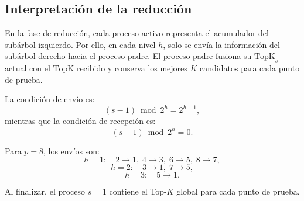 \documentclass[11pt,a4paper]{article}
\begin{document}
\begin{algorithm}[H]
\BlankLine
{}
\end{algorithm}

\begin{algorithm}
\end{algorithm}

\subsection{Interpretación de la reducción}

En la fase de reducción, cada proceso activo representa el acumulador del subárbol izquierdo.
Por ello, en cada nivel $h$, solo se envía la información del subárbol derecho hacia el proceso
padre. El proceso padre fusiona su $\mathrm{TopK}_s$ actual con el $\mathrm{TopK}$ recibido y conserva
los mejores $K$ candidatos para cada punto de prueba.

La condición de envío es:
\[
(s-1) \bmod 2^h = 2^{h-1},
\]
mientras que la condición de recepción es:
\[
(s-1) \bmod 2^h = 0.
\]

Para $p=8$, los envíos son:
\[
h=1: \quad 2\to1,\;4\to3,\;6\to5,\;8\to7,
\]
\[
h=2: \quad 3\to1,\;7\to5,
\]
\[
h=3: \quad 5\to1.
\]

Al finalizar, el proceso $s=1$ contiene el Top-$K$ global para cada punto de prueba.
\end{document}

